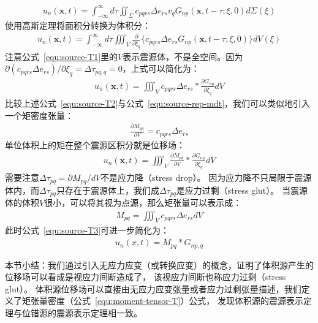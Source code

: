 \begin{align}
    u_{n}(\mathbf{x}, t)= \int\nolimits_{-\infty}^{\infty} d \tau \iint\nolimits_{\Sigma}  c_{pqrs} \Delta e_{rs} v_q  G_{n p}(\mathbf{x}, t-\tau ; \xi, 0)  d \Sigma(\xi) 
   \label{equ:source-T0}
\end{align}
使用高斯定理将面积分转换为体积分：
\begin{align}
    u_{n}(\mathbf{x}, t)= \int\nolimits_{-\infty}^{\infty} d \tau \iiint\nolimits_{V}  \frac{\partial}{\partial {\xi_q}} 
    \biggl\{ c_{pqrs} \Delta e_{rs}   G_{n p}(\mathbf{x}, t-\tau ; \xi, 0) \biggl\}
     dV(\xi) 
   \label{equ:source-T1}
\end{align}
注意公式~\ref{equ:source-T1}里的$V$表示震源体，不是全空间。因为$\partial(c_{pqrs} \Delta e_{rs})/\partial \xi_q = \Delta \tau_{pq,q} = 0$，上式可以简化为：
\begin{align}
    u_{n}(\mathbf{x}, t)=  \iiint\nolimits_{V}   
    c_{pqrs} \Delta e_{rs} \ast  \frac{\partial G_{n p}}{\partial {\xi_q}} 
    dV 
   \label{equ:source-T2}
\end{align}
比较上述公式~\ref{equ:source-T2}与公式~\ref{equ:source-rep-mdt}，我们可以类似地引入一个矩密度张量：
\begin{align}
    \frac{\partial M_{pq}}{\partial V} = c_{pqrs} \Delta e_{rs} 
   \label{equ:moment-tensor-T}
\end{align}
单位体积上的矩在整个震源区积分就是位移场：
\begin{align}
    u_{n}(\mathbf{x}, t)=  \iiint\nolimits_{V}   
    \frac{\partial M_{pq}}{\partial V} \ast  \frac{\partial G_{n p}}{\partial {\xi_q}} 
    dV 
   \label{equ:source-T3}
\end{align}
需要注意$\Delta \tau_{pq} = \partial M_{pq}/dV$不是应力降（stress drop）。
因为应力降不只局限于震源体内，而$\Delta \tau_{pq}$只存在于震源体上，我们成$\Delta \tau_{pq}$是应力过剩（stress glut）\citep{Backus1976b}。
当震源体的体积$V$很小，可以将其视为点源，那么矩张量可以表示成：
\begin{align}
     M_{pq} =  \iiint\nolimits_{V} c_{pqrs} \Delta e_{rs}  dV 
   \label{equ:source-T4}
\end{align}
此时公式~\ref{equ:source-T3}可进一步简化为：
\begin{align}
    u_n(x,t)=M_{pq}*G_{np,q}
    \label{equ:T-U-M*G}
\end{align}

本节小结：我们通过引入无应力应变（或转换应变）的概念，证明了体积源产生的位移场可以看成是视应力间断造成了，
该视应力间断也称应力过剩（stress glut）。
体积源位移场可以直接由无应力应变张量或者应力过剩张量描述，我们定义了矩张量密度（公式~\ref{equ:moment-tensor-T}）公式，
发现体积源的震源表示定理与位错源的震源表示定理相一致。






